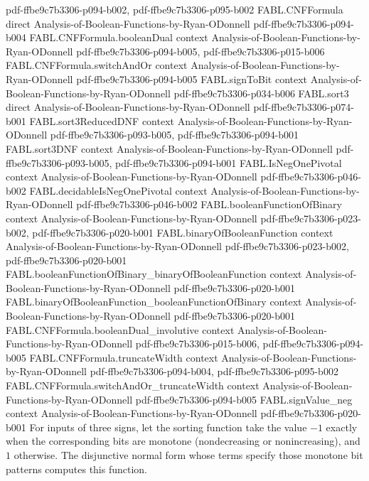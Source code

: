 \begin{theorem}
  {pdf-ffbe9c7b3306-p094-b002,
    pdf-ffbe9c7b3306-p095-b002}
\proofstep
  {FABL.CNFFormula}
  {direct}
  {Analysis-of-Boolean-Functions-by-Ryan-ODonnell}
  {pdf-ffbe9c7b3306-p094-b004}
\proofstep
  {FABL.CNFFormula.booleanDual}
  {context}
  {Analysis-of-Boolean-Functions-by-Ryan-ODonnell}
  {pdf-ffbe9c7b3306-p094-b005,
    pdf-ffbe9c7b3306-p015-b006}
\proofstep
  {FABL.CNFFormula.switchAndOr}
  {context}
  {Analysis-of-Boolean-Functions-by-Ryan-ODonnell}
  {pdf-ffbe9c7b3306-p094-b005}
\proofstep
  {FABL.signToBit}
  {context}
  {Analysis-of-Boolean-Functions-by-Ryan-ODonnell}
  {pdf-ffbe9c7b3306-p034-b006}
\proofstep
  {FABL.sort3}
  {direct}
  {Analysis-of-Boolean-Functions-by-Ryan-ODonnell}
  {pdf-ffbe9c7b3306-p074-b001}
\proofstep
  {FABL.sort3ReducedDNF}
  {context}
  {Analysis-of-Boolean-Functions-by-Ryan-ODonnell}
  {pdf-ffbe9c7b3306-p093-b005,
    pdf-ffbe9c7b3306-p094-b001}
\proofstep
  {FABL.sort3DNF}
  {context}
  {Analysis-of-Boolean-Functions-by-Ryan-ODonnell}
  {pdf-ffbe9c7b3306-p093-b005,
    pdf-ffbe9c7b3306-p094-b001}
\proofstep
  {FABL.IsNegOnePivotal}
  {context}
  {Analysis-of-Boolean-Functions-by-Ryan-ODonnell}
  {pdf-ffbe9c7b3306-p046-b002}
\proofstep
  {FABL.decidableIsNegOnePivotal}
  {context}
  {Analysis-of-Boolean-Functions-by-Ryan-ODonnell}
  {pdf-ffbe9c7b3306-p046-b002}
\proofstep
  {FABL.booleanFunctionOfBinary}
  {context}
  {Analysis-of-Boolean-Functions-by-Ryan-ODonnell}
  {pdf-ffbe9c7b3306-p023-b002,
    pdf-ffbe9c7b3306-p020-b001}
\proofstep
  {FABL.binaryOfBooleanFunction}
  {context}
  {Analysis-of-Boolean-Functions-by-Ryan-ODonnell}
  {pdf-ffbe9c7b3306-p023-b002,
    pdf-ffbe9c7b3306-p020-b001}
\proofstep
  {FABL.booleanFunctionOfBinary_binaryOfBooleanFunction}
  {context}
  {Analysis-of-Boolean-Functions-by-Ryan-ODonnell}
  {pdf-ffbe9c7b3306-p020-b001}
\proofstep
  {FABL.binaryOfBooleanFunction_booleanFunctionOfBinary}
  {context}
  {Analysis-of-Boolean-Functions-by-Ryan-ODonnell}
  {pdf-ffbe9c7b3306-p020-b001}
\proofstep
  {FABL.CNFFormula.booleanDual_involutive}
  {context}
  {Analysis-of-Boolean-Functions-by-Ryan-ODonnell}
  {pdf-ffbe9c7b3306-p015-b006,
    pdf-ffbe9c7b3306-p094-b005}
\proofstep
  {FABL.CNFFormula.truncateWidth}
  {context}
  {Analysis-of-Boolean-Functions-by-Ryan-ODonnell}
  {pdf-ffbe9c7b3306-p094-b004,
    pdf-ffbe9c7b3306-p095-b002}
\proofstep
  {FABL.CNFFormula.switchAndOr_truncateWidth}
  {context}
  {Analysis-of-Boolean-Functions-by-Ryan-ODonnell}
  {pdf-ffbe9c7b3306-p094-b005}
\proofstep
  {FABL.signValue_neg}
  {context}
  {Analysis-of-Boolean-Functions-by-Ryan-ODonnell}
  {pdf-ffbe9c7b3306-p020-b001}
For inputs of three signs, let the sorting function take the value $-1$ exactly when the
corresponding bits are monotone (nondecreasing or nonincreasing), and $1$ otherwise. The
disjunctive normal form whose terms specify those monotone bit patterns computes this
function.
\end{theorem}

